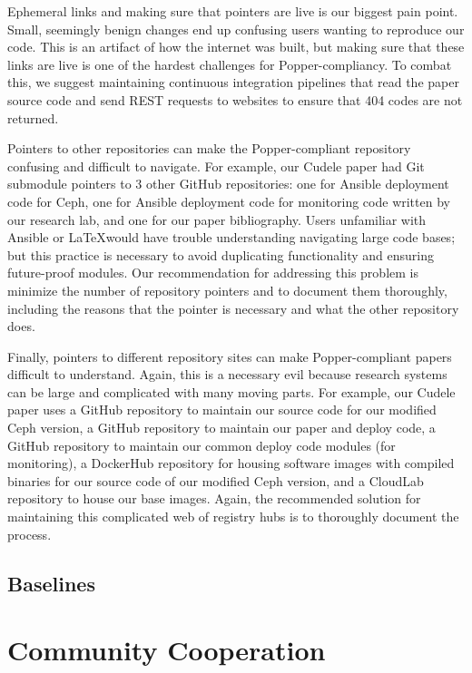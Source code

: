 Ephemeral links and making sure that pointers are live is our biggest pain
point. Small, seemingly benign changes end up confusing users wanting to
reproduce our code. This is an artifact of how the internet was built, but
making sure that these links are live is one of the hardest challenges for
Popper-compliancy. To combat this, we suggest maintaining continuous
integration pipelines that read the paper source code and send REST requests to
websites to ensure that 404 codes are not returned.

Pointers to other repositories can make the Popper-compliant repository
confusing and difficult to navigate. For example, our Cudele paper had Git
submodule pointers to 3 other GitHub repositories: one for Ansible deployment
code for Ceph, one for Ansible deployment code for monitoring code written by
our research lab, and one for our paper bibliography. Users unfamiliar with
Ansible or \LaTeX would have trouble understanding navigating large code bases;
but this practice is necessary to avoid duplicating functionality and ensuring
future-proof modules. Our recommendation for addressing this problem is
minimize the number of repository pointers and to document them thoroughly,
including the reasons that the pointer is necessary and what the other
repository does.

Finally, pointers to different repository sites can make Popper-compliant
papers difficult to understand. Again, this is a necessary evil because
research systems can be large and complicated with many moving parts. For
example, our Cudele paper uses a GitHub repository to maintain our source code
for our modified Ceph version, a GitHub repository to maintain our paper and
deploy code, a GitHub repository to maintain our common deploy code modules
(for monitoring), a DockerHub repository for housing software images with
compiled binaries for our source code of our modified Ceph version, and a
CloudLab repository to house our base images. Again, the recommended solution
for maintaining this complicated web of registry hubs is to thoroughly document
the process.

\subsection{Baselines}

\section{Community Cooperation}
\label{sec:community-cooperation}

